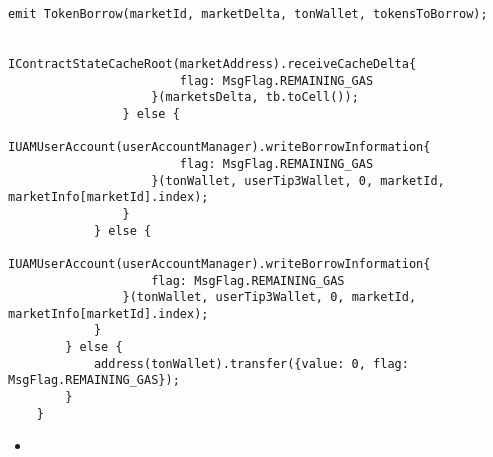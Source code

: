 \begin{lstlisting}[firstnumber=74]
                    emit TokenBorrow(marketId, marketDelta, tonWallet, tokensToBorrow);

                    IContractStateCacheRoot(marketAddress).receiveCacheDelta{
                        flag: MsgFlag.REMAINING_GAS
                    }(marketsDelta, tb.toCell());
                } else {
                    IUAMUserAccount(userAccountManager).writeBorrowInformation{
                        flag: MsgFlag.REMAINING_GAS
                    }(tonWallet, userTip3Wallet, 0, marketId, marketInfo[marketId].index);
                }
            } else {
                IUAMUserAccount(userAccountManager).writeBorrowInformation{
                    flag: MsgFlag.REMAINING_GAS
                }(tonWallet, userTip3Wallet, 0, marketId, marketInfo[marketId].index);
            }
        } else {
            address(tonWallet).transfer({value: 0, flag: MsgFlag.REMAINING_GAS});
        }
    }
\end{lstlisting}

\noindent\begin{itemize}
  \item {}
\end{itemize}

